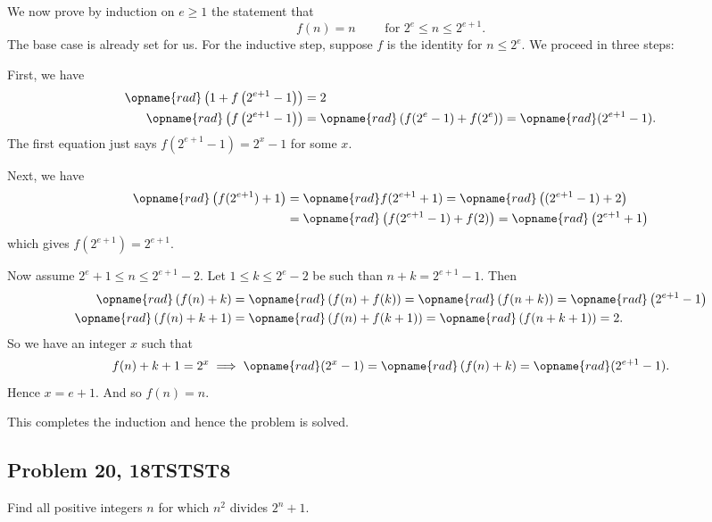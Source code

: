 \documentclass[11pt,twoside]{scrartcl}
\begin{document}
\begin{soln}
We now prove by induction on $e \ge 1$ the statement that
\[ f(n) = n \qquad \text{ for } 2^e \le n \le 2^{e+1}. \]
The base case is already set for us.
For the inductive step, suppose $f$ is the identity for $n \le 2^e$.
We proceed in three steps:
\begin{itemize}
\ii First, we have
\begin{align*}
	\opname{rad} \left( 1 + f\left( 2^{e+1}-1 \right) \right) &= 2 \\
	\opname{rad} \left( f\left( 2^{e+1}-1 \right) \right) &=
	\opname{rad} \left( f(2^e-1) + f(2^e) \right) = \opname{rad} (2^{e+1}-1).
\end{align*}
The first equation just says $f(2^{e+1}-1) = 2^x-1$ for some $x$.

\ii Next, we have
\begin{align*}
	\opname{rad} \left( f(2^{e+1}) + 1 \right)
	&= \opname{rad} f(2^{e+1}+1)
	= \opname{rad} \left( (2^{e+1}-1) + 2 \right) \\
	&= \opname{rad} \left( f(2^{e+1}-1) + f(2) \right)
	= \opname{rad} \left( 2^{e+1} + 1 \right)
\end{align*}
which gives $f(2^{e+1}) = 2^{e+1}$.

\ii Now assume $2^e + 1 \le n \le 2^{e+1}-2$.
Let $1 \le k \le 2^e - 2$ be such than $n+k = 2^{e+1}-1$.
Then
\begin{align*}
	\opname{rad} \left( f(n)+k \right)
	&= \opname{rad} \left( f(n)+f(k) \right)
	= \opname{rad} \left( f(n+k) \right) = \opname{rad} \left( 2^{e+1}-1 \right) \\
	\opname{rad} \left( f(n)+k+1 \right)
	&= \opname{rad} \left( f(n)+f(k+1) \right)
	= \opname{rad} \left( f(n+k+1) \right) = 2.
\end{align*}
So we have an integer $x$ such that
\[ f(n) + k + 1 = 2^x \implies
	\opname{rad}(2^x - 1)
	= \opname{rad} \left( f(n)+k \right)
	= \opname{rad}(2^{e+1}-1).  \]
Hence $x = e+1$.
And so $f(n) = n$.
\end{itemize}
This completes the induction and hence the problem is solved.

\end{soln}

\subsection{Problem 20, 18TSTST8}
\begin{problem}
    Find all positive integers $n$ for which $n^2$ divides $2^n + 1$.
\end{problem}
\end{document}
